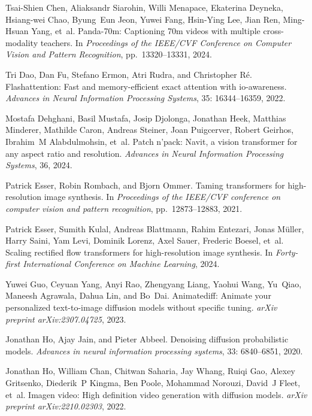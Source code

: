 \documentclass{article} \usepackage{iclr2024_conference,times}
\begin{document}
\begin{thebibliography}{45}
Tsai-Shien Chen, Aliaksandr Siarohin, Willi Menapace, Ekaterina Deyneka, Hsiang-wei Chao, Byung~Eun Jeon, Yuwei Fang, Hsin-Ying Lee, Jian Ren, Ming-Hsuan Yang, et~al.
\newblock Panda-70m: Captioning 70m videos with multiple cross-modality teachers.
\newblock In \emph{Proceedings of the IEEE/CVF Conference on Computer Vision and Pattern Recognition}, pp.\  13320--13331, 2024{}.

Tri Dao, Dan Fu, Stefano Ermon, Atri Rudra, and Christopher R{\'e}.
\newblock Flashattention: Fast and memory-efficient exact attention with io-awareness.
\newblock \emph{Advances in Neural Information Processing Systems}, 35: 16344--16359, 2022.

Mostafa Dehghani, Basil Mustafa, Josip Djolonga, Jonathan Heek, Matthias Minderer, Mathilde Caron, Andreas Steiner, Joan Puigcerver, Robert Geirhos, Ibrahim~M Alabdulmohsin, et~al.
\newblock Patch n’pack: Navit, a vision transformer for any aspect ratio and resolution.
\newblock \emph{Advances in Neural Information Processing Systems}, 36, 2024.

Patrick Esser, Robin Rombach, and Bjorn Ommer.
\newblock Taming transformers for high-resolution image synthesis.
\newblock In \emph{Proceedings of the IEEE/CVF conference on computer vision and pattern recognition}, pp.\  12873--12883, 2021.

Patrick Esser, Sumith Kulal, Andreas Blattmann, Rahim Entezari, Jonas M{\"u}ller, Harry Saini, Yam Levi, Dominik Lorenz, Axel Sauer, Frederic Boesel, et~al.
\newblock Scaling rectified flow transformers for high-resolution image synthesis.
\newblock In \emph{Forty-first International Conference on Machine Learning}, 2024.

Yuwei Guo, Ceyuan Yang, Anyi Rao, Zhengyang Liang, Yaohui Wang, Yu~Qiao, Maneesh Agrawala, Dahua Lin, and Bo~Dai.
\newblock Animatediff: Animate your personalized text-to-image diffusion models without specific tuning.
\newblock \emph{arXiv preprint arXiv:2307.04725}, 2023.

Jonathan Ho, Ajay Jain, and Pieter Abbeel.
\newblock Denoising diffusion probabilistic models.
\newblock \emph{Advances in neural information processing systems}, 33: 6840--6851, 2020.

Jonathan Ho, William Chan, Chitwan Saharia, Jay Whang, Ruiqi Gao, Alexey Gritsenko, Diederik~P Kingma, Ben Poole, Mohammad Norouzi, David~J Fleet, et~al.
\newblock Imagen video: High definition video generation with diffusion models.
\newblock \emph{arXiv preprint arXiv:2210.02303}, 2022.


\end{thebibliography}
\end{document}
